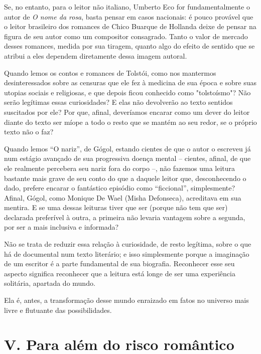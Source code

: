 Se, no entanto, para o leitor não italiano, Umberto Eco for
fundamentalmente o autor de \emph{O nome da rosa}, basta pensar em casos
nacionais: é pouco provável que o leitor brasileiro dos romances de
Chico Buarque de Hollanda deixe de pensar na figura de seu autor como um
compositor consagrado. Tanto o valor de mercado desses romances, medida
por sua tiragem, quanto algo do efeito de sentido que se atribui a eles
dependem diretamente dessa imagem autoral.

Quando lemos os contos e romances de Tolstói, como nos mantermos
desinteressados sobre as censuras que ele fez à medicina de sua época e
sobre suas utopias sociais e religiosas, e que depois ficou conhecido
como "tolstoísmo"? Não serão legítimas essas curiosidades? E elas não
devolverão ao texto sentidos suscitados por ele? Por que, afinal,
deveríamos encarar como um dever do leitor diante do texto ser míope a
todo o resto que se mantém ao seu redor, se o próprio texto não o faz?

Quando lemos ``O nariz'', de Gógol, estando cientes de que o autor o
escreveu já num estágio avançado de sua progressiva doença mental --
cientes, afinal, de que ele realmente percebera seu nariz fora do corpo
--, não fazemos uma leitura bastante mais grave de seu conto do que a
daquele leitor que, desconhecendo o dado, prefere encarar o fantástico
episódio como ``ficcional'', simplesmente? Afinal, Gógol, como Monique De Wael (Misha Defonseca), acreditava em sua mentira. E se uma dessas
leituras tiver que ser (porque não tem que ser) declarada preferível à
outra, a primeira não levaria vantagem sobre a segunda, por ser a mais
inclusiva e informada?

Não se trata de reduzir essa relação à curiosidade, de resto legítima,
sobre o que há de documental num texto literário; e isso simplesmente
porque a imaginação de um escritor é a parte fundamental de sua
biografia. Reconhecer esse seu aspecto significa reconhecer que a
leitura está longe de ser uma experiência solitária, apartada do mundo.

Ela é, antes, a transformação desse mundo enraizado em fatos no universo
mais livre e flutuante das possibilidades.

\section*{V. Para além do risco romântico}

